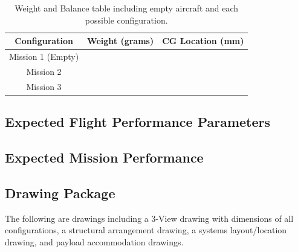 \documentclass[report]{byu-aero}
\begin{document}
\begin{table}[h!]
	\centering
	\caption{Weight and Balance table including empty aircraft and each possible configuration.}
	\label{tab:wieghtsandbalance}
	\begin{tabular}{ |c|c|c| } 
		\hline
		\rowcolor{BYUbluemid}
    	Configuration & Weight (grams) & CG Location (mm) \\
		\hline
	    Mission 1 (Empty) &  &  \\
		\hline
		Mission 2 &  &  \\
		\hline
		Mission 3 &  &  \\
		\hline
	\end{tabular}
\end{table}



\subsection{Expected Flight Performance Parameters}
\label{ssec:flightperformanceparams}




\subsection{Expected Mission Performance}
\label{ssec:missionperformance}



 
\subsection{Drawing Package}
\label{ssec:drawings}

The following are drawings including a 3-View drawing with dimensions of all configurations, a structural arrangement drawing, a systems layout/location drawing, and payload accommodation drawings.







\end{document}
